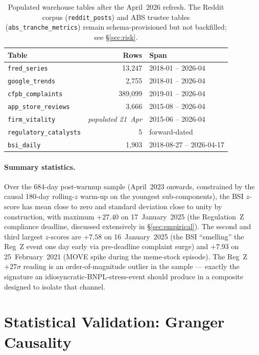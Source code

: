 \documentclass[11pt,letterpaper]{article}
\begin{document}
\begin{table}[H]
\centering
\small
\begin{tabular}{lrl}
\toprule
\textbf{Table} & \textbf{Rows} & \textbf{Span} \\
\midrule
\texttt{fred\_series}            & 13{,}247 & 2018-01 -- 2026-04 \\
\texttt{google\_trends}          &  2{,}755 & 2018-01 -- 2026-04 \\
\texttt{cfpb\_complaints}        & 389{,}099 & 2019-01 -- 2026-04 \\
\texttt{app\_store\_reviews}     &  3{,}666 & 2015-08 -- 2026-04 \\
\texttt{firm\_vitality}          & \textit{populated 21~Apr} & 2015-06 -- 2026-04 \\
\texttt{regulatory\_catalysts}   &  5        & forward-dated \\
\texttt{bsi\_daily}              &  1{,}903 & 2018-08-27 -- 2026-04-17 \\
\bottomrule
\end{tabular}
\caption{Populated warehouse tables after the April~2026 refresh. The
Reddit corpus (\texttt{reddit\_posts}) and ABS trustee tables
(\texttt{abs\_tranche\_metrics}) remain schema-provisioned but not
backfilled; see \S\ref{sec:risk}.}
\label{tab:warehouse}
\end{table}

\paragraph{Summary statistics.}
Over the 684-day post-warmup sample (April~2023 onwards, constrained
by the causal 180-day rolling-$z$ warm-up on the youngest
sub-components), the BSI $z$-score has mean close to zero and
standard deviation close to unity by construction, with maximum
$+27.40$ on 17~January~2025 (the Regulation~Z compliance deadline,
discussed extensively in \S\ref{sec:empirical}). The second and
third largest $z$-scores are $+7.58$ on 16~January~2025 (the BSI
``smelling'' the Reg~Z event one day early via pre-deadline
complaint surge) and $+7.93$ on 25~February~2021 (MOVE spike during
the meme-stock episode). The Reg~Z $+27\sigma$ reading is an
order-of-magnitude outlier in the sample --- exactly the signature
an idiosyncratic-BNPL-stress-event should produce in a composite
designed to isolate that channel.


\section{Statistical Validation: Granger Causality}
\label{sec:granger}
\end{document}
